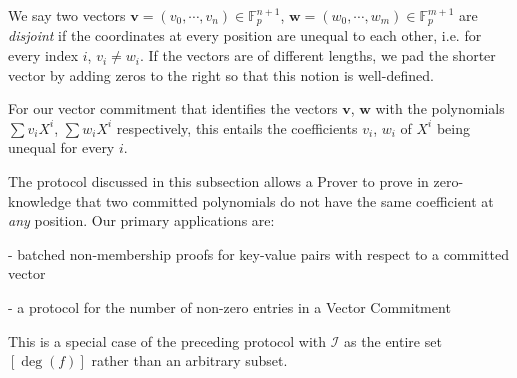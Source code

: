 \documentclass[11pt, lettersize, notitlepage, leqno, footskip=0.6cm]{article}
\newcommand{\bFp}{\mathbb{F}_p}
\newcommand{\mc}{\mathcal}
\newcommand{\mbf}{\mathbf}
\newcommand{\noin}{\noindent}
\numberwithin{equation}{section}
\begin{document}
\bigskip






We say two vectors $\mbf{v} = (v_0,\cdots,v_n)\in \bFp^{n+1}$, $\mbf{w}  = (w_0,\cdots,w_m)\in \bFp^{m+1}$ are \textit{disjoint} if the coordinates at every position are unequal to each other, i.e. for every index $i$, $v_i\neq w_i$. If the vectors are of different lengths, we pad the shorter vector by adding zeros to the right so that this notion is well-defined.  

For our vector commitment that identifies the vectors $\mbf{v}$, $\mbf{w}$ with the polynomials $\sum v_i X^i$, $\sum w_i X^i$ respectively, this entails the coefficients $v_i$, $w_i$ of $X^i$ being unequal for every $i$.

The protocol discussed in this subsection allows a Prover to prove in zero-knowledge that two committed polynomials do not have the same coefficient at \textit{any} position. Our primary applications are: \vspace{2mm}

\noin - batched non-membership proofs for key-value pairs with respect to a committed vector \vspace{1mm}

\noin  - a protocol for the number of non-zero entries in a Vector Commitment \vspace{2mm}


This is a special case of the preceding protocol with $\mc{I}$ as the entire set $[\deg(f)]$ rather than an arbitrary subset.
\end{document}
